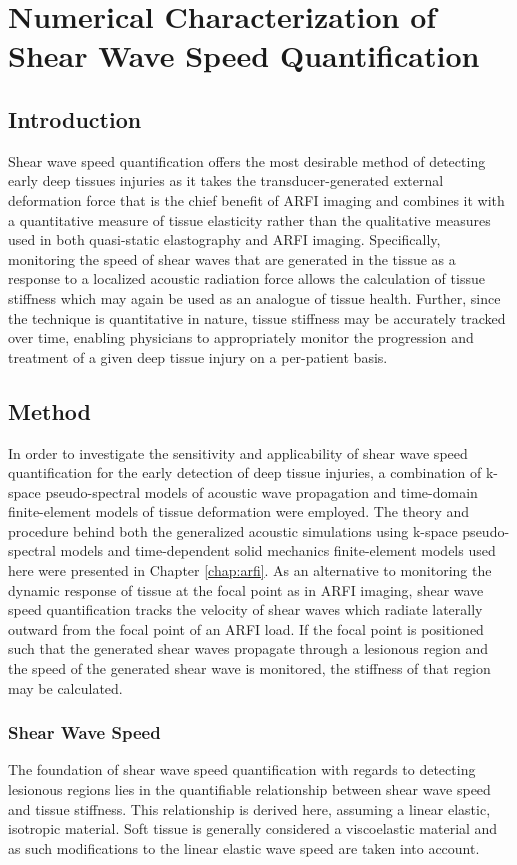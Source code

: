 \chapter{Numerical Characterization of Shear Wave Speed Quantification}
	\label{chap:shear}
	\section{Introduction}
		Shear wave speed quantification offers the most desirable method of detecting early deep tissues injuries as it takes the transducer-generated external deformation force that is the chief benefit of ARFI imaging and combines it with a quantitative measure of tissue elasticity rather than the qualitative measures used in both quasi-static elastography and ARFI imaging. Specifically, monitoring the speed of shear waves that are generated in the tissue as a response to a localized acoustic radiation force allows the calculation of tissue stiffness which may again be used as an analogue of tissue health. Further, since the technique is quantitative in nature, tissue stiffness may be accurately tracked over time, enabling physicians to appropriately monitor the progression and treatment of a given deep tissue injury on a per-patient basis.

	\section{Method}
	\label{sec:shear_method}
		In order to investigate the sensitivity and applicability of shear wave speed quantification for the early detection of deep tissue injuries, a combination of k-space pseudo-spectral models of acoustic wave propagation and time-domain finite-element models of tissue deformation were employed. The theory and procedure behind both the generalized acoustic simulations using k-space pseudo-spectral models and time-dependent solid mechanics finite-element models used here were presented in Chapter \ref{chap:arfi}. As an alternative to monitoring the dynamic response of tissue at the focal point as in ARFI imaging, shear wave speed quantification tracks the velocity of shear waves which radiate laterally outward from the focal point of an ARFI load. If the focal point is positioned such that the generated shear waves propagate through a lesionous region and the speed of the generated shear wave is monitored, the stiffness of that region may be calculated.

		\subsection{Shear Wave Speed}
			The foundation of shear wave speed quantification with regards to detecting lesionous regions lies in the quantifiable relationship between shear wave speed and tissue stiffness. This relationship is derived here, assuming a linear elastic, isotropic material. Soft tissue is generally considered a viscoelastic material and as such modifications to the linear elastic wave speed are taken into account.

